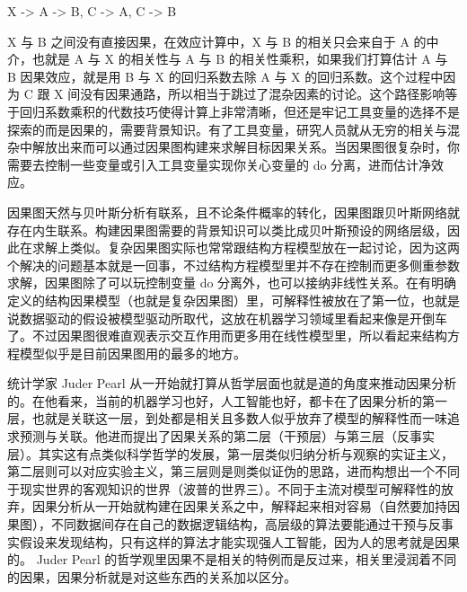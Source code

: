 \documentclass[]{tufte-book}
\begin{document}
X -\textgreater{} A -\textgreater{} B, C -\textgreater{} A, C -\textgreater{} B

X 与 B 之间没有直接因果，在效应计算中，X 与 B 的相关只会来自于 A 的中介，也就是 A 与 X 的相关性与 A 与 B 的相关性乘积，如果我们打算估计 A 与 B 因果效应，就是用 B 与 X 的回归系数去除 A 与 X 的回归系数。这个过程中因为 C 跟 X 间没有因果通路，所以相当于跳过了混杂因素的讨论。这个路径影响等于回归系数乘积的代数技巧使得计算上非常清晰，但还是牢记工具变量的选择不是探索的而是因果的，需要背景知识。有了工具变量，研究人员就从无穷的相关与混杂中解放出来而可以通过因果图构建来求解目标因果关系。当因果图很复杂时，你需要去控制一些变量或引入工具变量实现你关心变量的 do 分离，进而估计净效应。

因果图天然与贝叶斯分析有联系，且不论条件概率的转化，因果图跟贝叶斯网络就存在内生联系。构建因果图需要的背景知识可以类比成贝叶斯预设的网络层级，因此在求解上类似。复杂因果图实际也常常跟结构方程模型放在一起讨论，因为这两个解决的问题基本就是一回事，不过结构方程模型里并不存在控制而更多侧重参数求解，因果图除了可以玩控制变量 do 分离外，也可以接纳非线性关系。在有明确定义的结构因果模型（也就是复杂因果图）里，可解释性被放在了第一位，也就是说数据驱动的假设被模型驱动所取代，这放在机器学习领域里看起来像是开倒车了。不过因果图很难直观表示交互作用而更多用在线性模型里，所以看起来结构方程模型似乎是目前因果图用的最多的地方。

统计学家 Juder Pearl 从一开始就打算从哲学层面也就是道的角度来推动因果分析的。在他看来，当前的机器学习也好，人工智能也好，都卡在了因果分析的第一层，也就是关联这一层，到处都是相关且多数人似乎放弃了模型的解释性而一味追求预测与关联。他进而提出了因果关系的第二层（干预层）与第三层（反事实层）。其实这有点类似科学哲学的发展，第一层类似归纳分析与观察的实证主义，第二层则可以对应实验主义，第三层则是则类似证伪的思路，进而构想出一个不同于现实世界的客观知识的世界（波普的世界三）。不同于主流对模型可解释性的放弃，因果分析从一开始就构建在因果关系之中，解释起来相对容易（自然要加持因果图），不同数据间存在自己的数据逻辑结构，高层级的算法要能通过干预与反事实假设来发现结构，只有这样的算法才能实现强人工智能，因为人的思考就是因果的。 Juder Pearl 的哲学观里因果不是相关的特例而是反过来，相关里浸润着不同的因果，因果分析就是对这些东西的关系加以区分。
\end{document}
